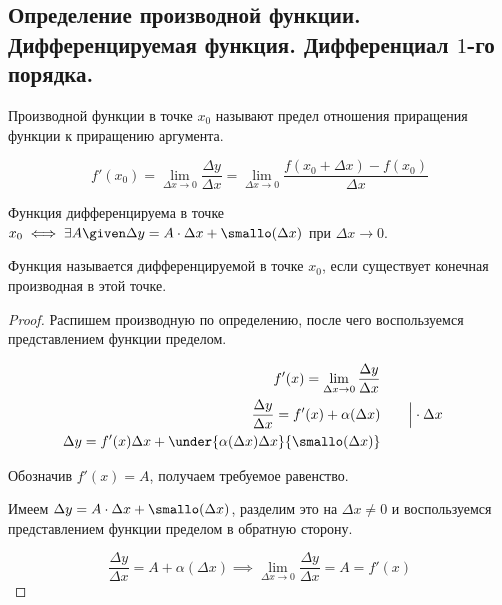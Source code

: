 \subsection{%
  Определение производной функции. Дифференцируемая функция. Дифференциал
  \(1\)-го порядка.%
}

\begin{definition}
  Производной функции в точке \(x_0\) называют предел отношения приращения
  функции к приращению аргумента.

  \begin{equation*}
    f'(x_0)
    = \lim_{\Delta x \to 0} \frac{\Delta y}{\Delta x}
    = \lim_{\Delta x \to 0} \frac{f(x_0 + \Delta x) - f(x_0)}{\Delta x}
  \end{equation*}
\end{definition}

\begin{definition}
  Функция дифференцируема в точке \(x_0 \iff \exists A \given \Delta y = A \cdot
  \Delta x + \smallo(\Delta x)\) при \(\Delta x \to 0\).
\end{definition}

\begin{theorem}
  Функция называется дифференцируемой в точке \(x_0\), если существует конечная
  производная в этой точке.
\end{theorem}

\begin{proof}
  \ness Распишем производную по определению, после чего воспользуемся
  представлением функции пределом.

  \begin{equation*}
    \begin{aligned}
      f'(x) = \lim_{\Delta x \to 0} \frac{\Delta y}{\Delta x}
    \\
      \frac{\Delta y}{\Delta x} = f'(x) + \alpha(\Delta x)
        & \qquad \Big\vert \cdot \Delta x
    \\
      \Delta y = f'(x) \Delta x
        + \under{\alpha(\Delta x) \Delta x}{\smallo(\Delta x)}
    \end{aligned}
  \end{equation*}

  Обозначив \(f'(x) = A\), получаем требуемое равенство.

  \suff Имеем \(\Delta y = A \cdot \Delta x + \smallo(\Delta x)\), разделим это
  на \(\Delta x \neq 0\) и воспользуемся представлением функции пределом в
  обратную сторону.
  
  \begin{equation*}
    \frac{\Delta y}{\Delta x} = A + \alpha(\Delta x)
    \implies
    \lim_{\Delta x \to 0} \frac{\Delta y}{\Delta x} = A = f'(x)  
  \end{equation*}
\end{proof}

